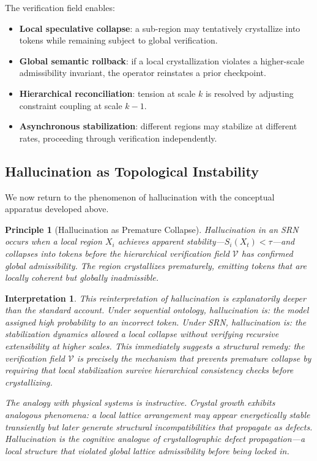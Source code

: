 \documentclass[11pt, a4paper]{article}
\theoremstyle{srn}
\newtheorem{principle}{Principle}[section]
\theoremstyle{srnremark}
\newtheorem{interpretation}{Interpretation}[section]
\begin{document}
The verification field enables:
\begin{itemize}
  \item \textbf{Local speculative collapse}: a sub-region may
    tentatively crystallize into tokens while remaining subject to
    global verification.
  \item \textbf{Global semantic rollback}: if a local crystallization
    violates a higher-scale admissibility invariant, the operator
    reinstates a prior checkpoint.
  \item \textbf{Hierarchical reconciliation}: tension at scale $k$
    is resolved by adjusting constraint coupling at scale $k-1$.
  \item \textbf{Asynchronous stabilization}: different regions may
    stabilize at different rates, proceeding through verification
    independently.
\end{itemize}

\subsection{Hallucination as Topological Instability}

We now return to the phenomenon of hallucination with the conceptual
apparatus developed above.

\begin{principle}[Hallucination as Premature Collapse]
\label{prin:hallucination}
Hallucination in an SRN occurs when a local region $X_i$ achieves
apparent stability---$S_i(X_t) < \tau$---and collapses into tokens
before the hierarchical verification field $\mathcal{V}$ has confirmed
global admissibility.
The region crystallizes prematurely, emitting tokens that are locally
coherent but globally inadmissible.
\end{principle}

\begin{interpretation}
This reinterpretation of hallucination is explanatorily deeper than the
standard account.
Under sequential ontology, hallucination is: the model assigned high
probability to an incorrect token.
Under SRN, hallucination is: the stabilization dynamics allowed a
local collapse without verifying recursive extensibility at higher
scales.
This immediately suggests a structural remedy: the verification
field $\mathcal{V}$ is precisely the mechanism that prevents premature
collapse by requiring that local stabilization survive hierarchical
consistency checks before crystallizing.

The analogy with physical systems is instructive.
Crystal growth exhibits analogous phenomena: a local lattice
arrangement may appear energetically stable transiently but later
generate structural incompatibilities that propagate as defects.
Hallucination is the cognitive analogue of crystallographic defect
propagation---a local structure that violated global lattice
admissibility before being locked in.
\end{interpretation}
\end{document}

